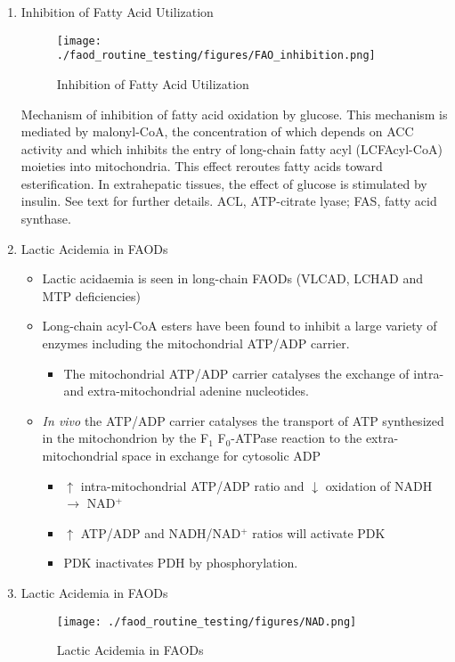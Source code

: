 \documentclass{scrartcl}
\begin{document}
\begin{enumerate}
\item Inhibition of Fatty Acid Utilization
\label{sec:org56a2fa7}

\begin{figure}[htbp]
\centering
\texttt{[image: ./faod\_routine\_testing/figures/FAO\_inhibition.png]}
\caption{\label{fig:org75b6a39}
Inhibition of Fatty Acid Utilization}
\end{figure}

Mechanism of inhibition of fatty acid oxidation by glucose. This
mechanism is mediated by malonyl-CoA, the concentration of which
depends on ACC activity and which inhibits the entry of long-chain
fatty acyl (LCFAcyl-CoA) moieties into mitochondria. This effect
reroutes fatty acids toward esterification. In extrahepatic tissues,
the effect of glucose is stimulated by insulin. See text for further
details. ACL, ATP-citrate lyase; FAS, fatty acid synthase.

\item Lactic Acidemia in FAODs
\label{sec:orgca75f9a}
\begin{itemize}
\item Lactic acidaemia is seen in long-chain FAODs (VLCAD, LCHAD and MTP deficiencies)
\item Long-chain acyl-CoA esters have been found to inhibit a large
variety of enzymes including the mitochondrial ATP/ADP carrier.
\begin{itemize}
\item The mitochondrial ATP/ADP carrier catalyses the exchange of intra- and
extra-mitochondrial adenine nucleotides.
\end{itemize}
\item \emph{In vivo} the ATP/ADP carrier catalyses the transport of ATP
synthesized in the mitochondrion by the F\(_{\text{1}}\) F\(_{\text{0}}\)-ATPase reaction to the
extra-mitochondrial space in exchange for cytosolic ADP
\begin{itemize}
\item \(\uparrow\) intra-mitochondrial ATP/ADP ratio and \(\downarrow\) oxidation of
NADH \(\to\) NAD\(^{\text{+}}\)
\item \(\uparrow\) ATP/ADP and NADH/NAD\(^{\text{+}}\) ratios will activate PDK
\item PDK inactivates PDH by phosphorylation.
\end{itemize}
\end{itemize}

\item Lactic Acidemia in FAODs
\label{sec:orgb508b8f}
\begin{figure}[htbp]
\centering
\texttt{[image: ./faod\_routine\_testing/figures/NAD.png]}
\caption{\label{fig:org6b024e1}
Lactic Acidemia in FAODs}
\end{figure}


\end{enumerate}
\end{document}
